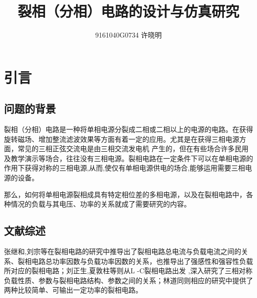 \documentclass[12pt]{article}%
\title{ \heiti\zihao{3}裂相（分相）电路的设计与仿真研究}
\author{9161040G0734 许晓明}
\date{}
\begin{document}
\maketitle
{}

\tableofcontents
{}
\newpage
 \fontsize{12.5pt}{0}
\section{引言}
\subsection{问题的背景}
裂相（分相）电路是一种将单相电源分裂成二相或二相以上的电源的电路。在获得旋转磁场、增加整流滤波效果等方面有着一定的应用。尤其是在获得三相电源方面，常见的三相正弦交流电是由三相交流发电机
产生的，但在有些场合许多民用及教学演示等场合，往往没有三相电源。裂相电路在一定条件下可以在单相电源的作用下获得对称的三相电源,从而,使仅有单相电源供电的场合,能够运用需要三相电源的设备。

那么，如何将单相电源裂相成具有特定相位差的多相电源，以及在裂相电路中，各种情况的负载与其电压、功率的关系就成了需要研究的内容。
\subsection{文献综述}
张继和,刘宗等在裂相电路的研究中推导出了裂相电路总电流与负载电流之间的关系、裂相电路总功率因数与负载功率因数的关系\cite{1}，也推导出了强感性和强容性负载所对应的裂相电路\cite{3}；刘正生,夏敦柱等则从L -C裂相电路出发 ,深入研究了三相对称负载性质、参数与裂相电路结构、参数之间的关系\cite{2}；林道同则相应的研究中提供了两种比较简单、可输出一定功率的裂相电路\cite{4}。\par
\end{document}
